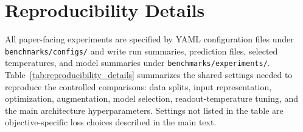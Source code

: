 \documentclass[12pt]{article}
\begin{document}
\section{Reproducibility Details}
\label{app:reproducibility_details}

All paper-facing experiments are specified by YAML configuration files under \texttt{benchmarks/configs/} and write run summaries, prediction files, selected temperatures, and model summaries under \texttt{benchmarks/experiments/}. Table~\ref{tab:reproducibility_details} summarizes the shared settings needed to reproduce the controlled comparisons: data splits, input representation, optimization, augmentation, model selection, readout-temperature tuning, and the main architecture hyperparameters. Settings not listed in the table are objective-specific loss choices described in the main text.
\end{document}
